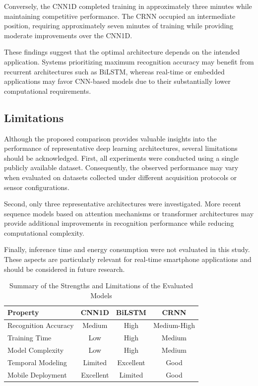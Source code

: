 \documentclass[journal]{IEEEtran}
\begin{document}
Conversely, the CNN1D completed training in approximately three minutes while maintaining competitive performance. The CRNN occupied an intermediate position, requiring approximately seven minutes of training while providing moderate improvements over the CNN1D.

These findings suggest that the optimal architecture depends on the intended application. Systems prioritizing maximum recognition accuracy may benefit from recurrent architectures such as BiLSTM, whereas real-time or embedded applications may favor CNN-based models due to their substantially lower computational requirements.

\subsection{Limitations}

Although the proposed comparison provides valuable insights into the performance of representative deep learning architectures, several limitations should be acknowledged. First, all experiments were conducted using a single publicly available dataset. Consequently, the observed performance may vary when evaluated on datasets collected under different acquisition protocols or sensor configurations.

Second, only three representative architectures were investigated. More recent sequence models based on attention mechanisms or transformer architectures may provide additional improvements in recognition performance while reducing computational complexity.

Finally, inference time and energy consumption were not evaluated in this study. These aspects are particularly relevant for real-time smartphone applications and should be considered in future research.

\begin{table}[!t]
\caption{Summary of the Strengths and Limitations of the Evaluated Models}
\label{tab:discussion}
\centering
\begin{tabular}{lccc}
\hline
Property & CNN1D & BiLSTM & CRNN\\
\hline
Recognition Accuracy & Medium & High & Medium-High\\
Training Time & Low & High & Medium\\
Model Complexity & Low & High & Medium\\
Temporal Modeling & Limited & Excellent & Good\\
Mobile Deployment & Excellent & Limited & Good\\
\hline
\end{tabular}
\end{table}
\end{document}
